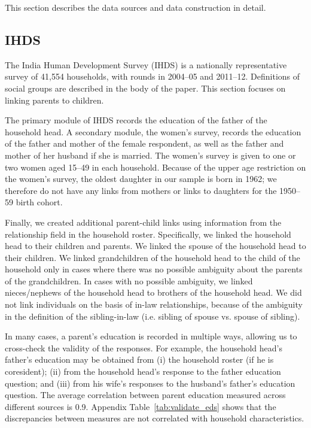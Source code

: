 
This section describes the data sources and data construction in
detail. 

\subsection{IHDS}

The India Human Development Survey (IHDS) is a nationally
representative survey of 41,554 households, with rounds in 2004--05
and 2011--12. Definitions of social groups are described in the body
of the paper. This section focuses on linking parents to children.

The primary module of IHDS records the education of the father of the household
head. A secondary module, the women's survey, records the education of
the father and mother of the female respondent, as well as the father
and mother of her husband if she is married. The women's survey is
given to one or two women aged 15--49 in each household. Because of
the upper age restriction on the women's survey, the oldest daughter
in our sample is born in 1962; we therefore do not have any links from
mothers or links to daughters for the 1950--59 birth cohort.

Finally, we created additional parent-child links using information
from the relationship field in the household roster. Specifically, we
linked the household head to their children and parents. We linked the
spouse of the household head to their children. We linked
grandchildren of the household head to the child of the household only
in cases where there was no possible ambiguity about the parents of
the grandchildren. In cases with no possible ambiguity, we linked
nieces/nephews of the household head to brothers of the household
head. We did not link individuals on the basis of in-law
relationships, because of the ambiguity in the definition of the
sibling-in-law (i.e. sibling of spouse vs. spouse of sibling).

In many cases, a parent's education is recorded in multiple ways,
allowing us to cross-check the validity of the responses.  For
example, the household head's father's education may be obtained from
(i) the household roster (if he is coresident); (ii) from the
household head's response to the father education question; and (iii)
from his wife's responses to the husband's father's education
question. The average correlation between parent education measured
across different sources is 0.9. Appendix Table~\ref{tab:validate_eds}
shows that the discrepancies between measures are not correlated with
household characteristics.


